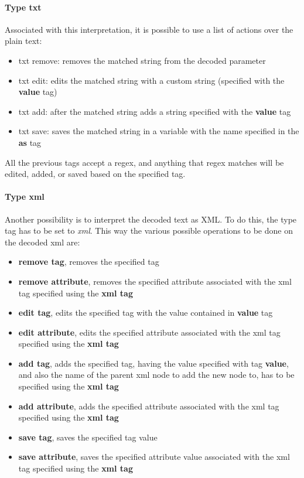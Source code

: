 \paragraph{Type txt}
Associated with this interpretation, it is possible to use a list of actions over the plain text:
\begin{itemize}
    \item txt remove: removes the matched string from the decoded parameter
    \item txt edit: edits the matched string with a custom string (specified with the \textbf{value} tag)
    \item txt add: after the matched string adds a string specified with the \textbf{value} tag
    \item txt save: saves the matched string in a variable with the name specified in the \textbf{as} tag
\end{itemize}
All the previous tags accept a regex, and anything that regex matches will be edited, added, or saved based on the specified tag.

\paragraph{Type xml}
Another possibility is to interpret the decoded text as XML. To do this, the type tag has to be set to \textit{xml}.
This way the various possible operations to be done on the decoded xml are:
\begin{itemize}
    \item \textbf{remove tag}, removes the specified tag
    \item \textbf{remove attribute}, removes the specified attribute associated with the xml tag specified using the \textbf{xml tag}
    \item \textbf{edit tag}, edits the specified tag with the value contained in \textbf{value} tag 
    \item \textbf{edit attribute}, edits the specified attribute associated with the xml tag specified using the \textbf{xml tag}
    \item \textbf{add tag}, adds the specified tag, having the value specified with tag \textbf{value}, and also the name of the parent xml node to add the new node to, has to be specified using the \textbf{xml tag}
    \item \textbf{add attribute}, adds the specified attribute associated with the xml tag specified using the \textbf{xml tag}
    \item \textbf{save tag}, saves the specified tag value
    \item \textbf{save attribute}, saves the specified attribute value associated with the xml tag specified using the \textbf{xml tag}
\end{itemize}

